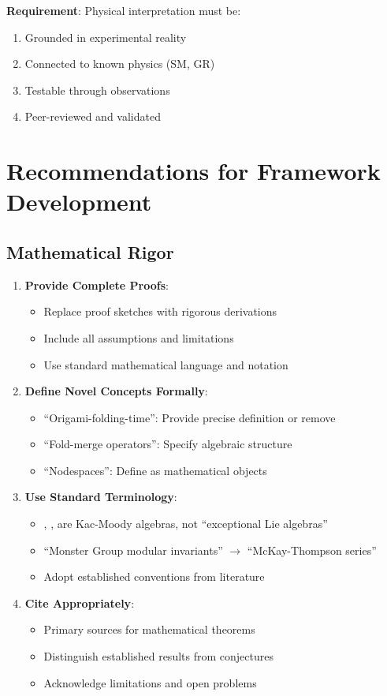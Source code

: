 \textbf{Requirement}: Physical interpretation must be:
\begin{enumerate}
    \item Grounded in experimental reality
    \item Connected to known physics (SM, GR)
    \item Testable through observations
    \item Peer-reviewed and validated
\end{enumerate}

\section{Recommendations for Framework Development}

\subsection{Mathematical Rigor}

\begin{enumerate}
    \item \textbf{Provide Complete Proofs}:
    \begin{itemize}
        \item Replace proof sketches with rigorous derivations
        \item Include all assumptions and limitations
        \item Use standard mathematical language and notation
    \end{itemize}

    \item \textbf{Define Novel Concepts Formally}:
    \begin{itemize}
        \item ``Origami-folding-time'': Provide precise definition or remove
        \item ``Fold-merge operators'': Specify algebraic structure
        \item ``Nodespaces'': Define as mathematical objects
    \end{itemize}

    \item \textbf{Use Standard Terminology}:
    \begin{itemize}
        \item {}, ,  are Kac-Moody algebras, not ``exceptional Lie algebras''
        \item ``Monster Group modular invariants'' $\to$ ``McKay-Thompson series''
        \item Adopt established conventions from literature
    \end{itemize}

    \item \textbf{Cite Appropriately}:
    \begin{itemize}
        \item Primary sources for mathematical theorems
        \item Distinguish established results from conjectures
        \item Acknowledge limitations and open problems
    \end{itemize}
\end{enumerate}

